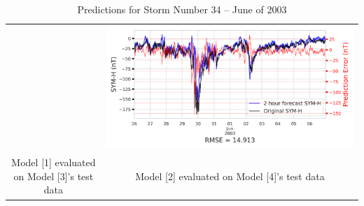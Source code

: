 \documentclass[draft,sw]{agutexSI2019}
\begin{document}
\begin{table}
\begin{tabular}{cc}
&
\includegraphics[width=0.49\linewidth]{paper_plots/2h_swics_model_on_no_swics/2h_swics_model_on_no_swics_storm_34.png}
\\
Model [1] evaluated on Model [3]'s test data & Model [2] evaluated on Model [4]'s test data
\vspace*{12pt}
\\
\end{tabular}
\caption{Predictions for Storm Number 34 -- June of 2003}
\label{storm-34}
\end{table}
\end{document}
